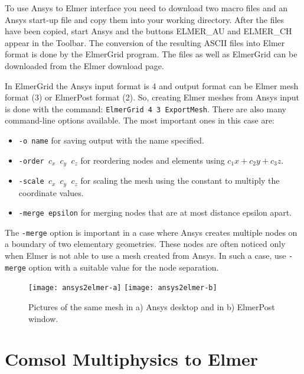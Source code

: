 To use Ansys to Elmer interface you need to download two macro files
and an Ansys start-up file and copy them into your working
directory. After the files have been copied, start Ansys and the
buttons ELMER\_AU and ELMER\_CH appear in the Toolbar. The conversion of
the resulting ASCII files into Elmer format is done by the ElmerGrid
program. The files as well as ElmerGrid can be downloaded from the
Elmer download page.

%
%
In ElmerGrid the Ansys input format is 4 and output
format can be Elmer mesh format (3) or ElmerPost format (2). So,
creating Elmer meshes from Ansys input is done with the command:
\texttt{ElmerGrid 4 3 ExportMesh}. There are also many command-line 
options available. The
most important ones in this case are:
%
\begin{itemize}
  \item \texttt{-o name} for saving output with the name specified.  
  \item \texttt{-order $c_x$ $c_y$ $c_z$} for reordering nodes and elements using $c_1x+c_2y +c_3z$.  
  \item \texttt{-scale $c_x$ $c_y$ $c_z$} for scaling the mesh using the constant to multiply
the coordinate values.
  \item \texttt{-merge epsilon} for merging nodes that are at most distance epsilon apart.
\end{itemize}

The \texttt{-merge} option is important in a case where Ansys creates multiple
nodes on a boundary of two elementary geometries. These nodes are
often noticed only when Elmer is not able to use a mesh created from
Ansys. In such a case, use \texttt{-merge} option with a suitable value 
for the node separation.

\begin{figure}[H]
\centering
\texttt{[image: ansys2elmer-a]}
\hspace{10mm}
\texttt{[image: ansys2elmer-b]}
\caption{Pictures of the same mesh in a) Ansys desktop and in b) ElmerPost window.}
\label{fg:pic5}
\end{figure}


\section{Comsol Multiphysics to Elmer}

